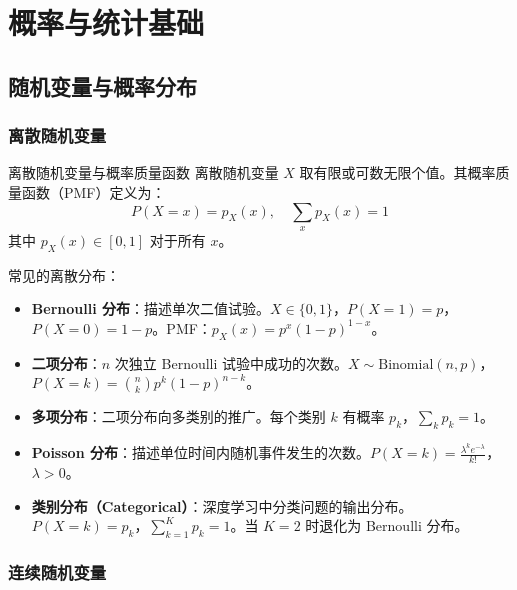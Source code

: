\chapter{概率与统计基础}


\section{随机变量与概率分布}

\subsection{离散随机变量}

\begin{mydefinition}{离散随机变量与概率质量函数}
离散随机变量 $X$ 取有限或可数无限个值。其概率质量函数（PMF）定义为：
\[
P(X=x)=p_X(x), \quad \sum_{x} p_X(x) = 1
\]
其中 $p_X(x)\in[0,1]$ 对于所有 $x$。
\end{mydefinition}

常见的离散分布：

\begin{itemize}
    \item \textbf{Bernoulli 分布}：描述单次二值试验。$X\in\{0,1\}$，$P(X=1)=p$，$P(X=0)=1-p$。PMF：$p_X(x)=p^x(1-p)^{1-x}$。
    \item \textbf{二项分布}：$n$ 次独立 Bernoulli 试验中成功的次数。$X\sim\text{Binomial}(n,p)$，$P(X=k)=\binom{n}{k}p^k(1-p)^{n-k}$。
    \item \textbf{多项分布}：二项分布向多类别的推广。每个类别 $k$ 有概率 $p_k$，$\sum_k p_k=1$。
    \item \textbf{Poisson 分布}：描述单位时间内随机事件发生的次数。$P(X=k)=\frac{\lambda^k e^{-\lambda}}{k!}$，$\lambda>0$。
    \item \textbf{类别分布（Categorical）}：深度学习中分类问题的输出分布。$P(X=k)=p_k$，$\sum_{k=1}^{K}p_k=1$。当 $K=2$ 时退化为 Bernoulli 分布。
\end{itemize}

\subsection{连续随机变量}

